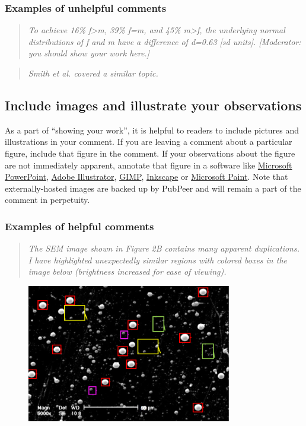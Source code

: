 \documentclass[letterpaper, 12pt]{article}
\begin{document}
\subsubsection*{Examples of unhelpful comments}

\begin{quote}
    \textit{To achieve 16\% f>m, 39\% f=m, and 45\% m>f, the underlying normal distributions of f and m have a difference of d=0.63 [sd units]. [Moderator: you should show your work here.]}
\end{quote}

\begin{quote}
    \textit{Smith et al. covered a similar topic.}
\end{quote}

\subsection*{Include images and illustrate your observations}

As a part of ``showing your work'', it is helpful to readers to include pictures and illustrations in your comment. If you are leaving a comment about a particular figure, include that figure in the comment. If your observations about the figure are not immediately apparent, annotate that figure in a software like \href{https://www.microsoft.com/en-us/microsoft-365/powerpoint}{Microsoft PowerPoint}, \href{https://www.adobe.com/products/illustrator.html}{Adobe Illustrator}, \href{https://www.gimp.org/}{GIMP}, \href{https://inkscape.org/}{Inkscape} or \href{https://www.microsoft.com/en-us/windows/paint}{Microsoft Paint}. Note that externally-hosted images are backed up by PubPeer and will remain a part of the comment in perpetuity.

\subsubsection*{Examples of helpful comments}

\begin{quote}
    \textit{The SEM image shown in Figure 2B contains many apparent duplications. I have highlighted unexpectedly similar regions with colored boxes in the image below (brightness increased for ease of viewing).}
\end{quote}

\begin{figure}[h!tbp]
\centering
    \includegraphics[width=0.8\textwidth]{img/pubpeer/pubpeer_dupes.png}
\end{figure}
\end{document}
